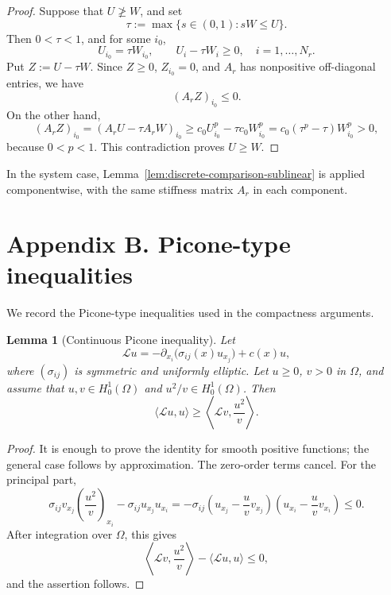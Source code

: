 \documentclass[preprint,10pt]{elsarticle}
\numberwithin{equation}{section}
\newtheorem{lem}[thm]{Lemma}
\begin{document}
\begin{proof}
	Suppose that \(U\not\ge W\), and set
	\[
	\tau:=\max\{s\in(0,1):sW\le U\}.
	\]
	Then \(0<\tau<1\), and for some \(i_0\),
	\[
	U_{i_0}=\tau W_{i_0},
	\qquad
	U_i-\tau W_i\ge0,\quad i=1,\ldots,N_r .
	\]
	Put \(Z:=U-\tau W\). Since \(Z\ge0\), \(Z_{i_0}=0\), and \(A_r\) has
	nonpositive off-diagonal entries, we have
	\[
	(A_rZ)_{i_0}\le0 .
	\]
	On the other hand,
	\[
	(A_rZ)_{i_0}
	=
	(A_rU-\tau A_rW)_{i_0}
	\ge
	c_0U_{i_0}^p-\tau c_0W_{i_0}^p
	=
	c_0(\tau^p-\tau)W_{i_0}^p>0,
	\]
	because \(0<p<1\). This contradiction proves \(U\ge W\).
\end{proof}

In the system case, Lemma~\ref{lem:discrete-comparison-sublinear} is applied
componentwise, with the same stiffness matrix \(A_r\) in each component.


\section{Appendix B. Picone-type inequalities}
\label{sec:appendix-picone}

We record the Picone-type inequalities used in the compactness arguments.


\begin{lem}[Continuous Picone inequality]
	\label{lem:picone-continuous}
	Let
	\[
	\mathcal L u
	=
	-\partial_{x_i}\bigl(\sigma_{ij}(x)u_{x_j}\bigr)+c(x)u,
	\]
	where \((\sigma_{ij})\) is symmetric and uniformly elliptic. Let
	\(u\ge0\), \(v>0\) in \(\Omega\), and assume that
	\(u,v\in H_0^1(\Omega)\) and \(u^2/v\in H_0^1(\Omega)\). Then
	\[
	\langle\mathcal L u,u\rangle
	\ge
	\left\langle
	\mathcal L v,\frac{u^2}{v}
	\right\rangle .
	\]
\end{lem}

\begin{proof}
	It is enough to prove the identity for smooth positive functions; the
	general case follows by approximation. The zero-order terms cancel. For
	the principal part,
	\[
	\sigma_{ij}v_{x_j}
	\left(\frac{u^2}{v}\right)_{x_i}
	-
	\sigma_{ij}u_{x_j}u_{x_i}
	=
	-
	\sigma_{ij}
	\left(u_{x_j}-\frac{u}{v}v_{x_j}\right)
	\left(u_{x_i}-\frac{u}{v}v_{x_i}\right)
	\le0 .
	\]
	After integration over \(\Omega\), this gives
	\[
	\left\langle
	\mathcal L v,\frac{u^2}{v}
	\right\rangle
	-
	\langle\mathcal L u,u\rangle
	\le0,
	\]
	and the assertion follows.
\end{proof}
\end{document}
